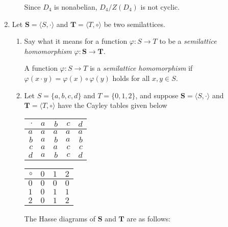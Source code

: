 \documentclass[fleqn,12pt]{article}
\newcommand{\<}{\ensuremath{\langle}}
\renewcommand{\>}{\ensuremath{\rangle}}
\newcommand{\bS}{\ensuremath{\mathbf{S}}}
\newcommand{\bT}{\ensuremath{\mathbf{T}}}
\begin{document}
\begin{enumerate}[{\bf 1.}]
\begin{enumerate}
\medskip

Since $D_4$ is nonabelian, $D_4/Z(D_4)$ is not cyclic.
\end{enumerate}
\newpage

\item Let $\bS = \<S, \cdot\>$ and $\bT = \<T, \circ\>$ be two semilattices.
  \begin{enumerate}
  \item Say what it means for a function $\varphi: S \rightarrow T$ to be a
    \emph{semilattice homomorphism} $\varphi: \bS \rightarrow \bT$.

\medskip

A function $\varphi: S \rightarrow T$ is
a \emph{semilattice homomorphism} if  
$\varphi(x\cdot y) = \varphi(x) \circ \varphi(y)$
holds for all $x, y \in S$.

\bigskip

\item Let $S = \{a, b, c, d\}$ and $T = \{0, 1, 2\}$, and suppose 
  $\bS = \<S, \cdot\>$ and
  $\bT= \<T, \circ\>$ have the Cayley tables given below

\medskip
\begin{center}
\begin{tabular}{r|rrrr}
  $\cdot$ & $a$ &$b$&$c$&$d $\\
\hline
  $a$ & $a$ &$a$&$a$&$a$\\
  $b$ & $a$ &$b$&$a$&$b$\\
  $c$ & $a$ &$a$&$c$&$c$\\
  $d$ & $a$ &$b$&$c$&$d$
\end{tabular}
\hskip2cm
\begin{tabular}{r|rrr}
  $\circ$ & $0$ &$1$&$2$\\
\hline
  $0$ & $0$ &$0$&$0$\\
  $1$ & $0$ &$1$&$1$\\
  $2$ & $0$ &$1$&$2$
\end{tabular}
\end{center}

\medskip
The Hasse diagrams of $\bS$ and $\bT$ are as follows:
\begin{center}
  
\end{center}
\end{enumerate}
\end{enumerate}
\end{document}
